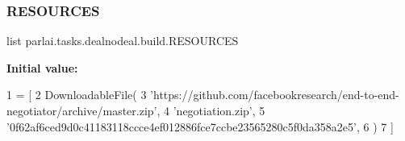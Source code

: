 \subsubsection{\texorpdfstring{R\+E\+S\+O\+U\+R\+C\+ES}{RESOURCES}}
{\footnotesize\ttfamily list parlai.\+tasks.\+dealnodeal.\+build.\+R\+E\+S\+O\+U\+R\+C\+ES}

{\bfseries Initial value\+:}
\begin{DoxyCode}
1 =  [
2     DownloadableFile(
3         \textcolor{stringliteral}{'https://github.com/facebookresearch/end-to-end-negotiator/archive/master.zip'},
4         \textcolor{stringliteral}{'negotiation.zip'},
5         \textcolor{stringliteral}{'0f62af6ced9d0c41183118ccce4ef012886fce7ccbe23565280c5f0da358a2e5'},
6     )
7 ]
\end{DoxyCode}
